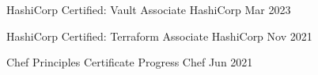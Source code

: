 \newpage\textcolor{awesome}{\raisebox{0.1\height}{\faCertificate\thinspace}}


\begin{cvhonors}

  \cvhonor
    {HashiCorp Certified: Vault Associate} %
    {HashiCorp} %
    {} %
    {Mar 2023} %

  \cvhonor
    {HashiCorp Certified: Terraform Associate} %
    {HashiCorp} %
    {} %
    {Nov 2021} %

  \cvhonor
    {Chef Principles Certificate} %
    {Progress Chef} %
    {} %
    {Jun 2021} %

\end{cvhonors}
